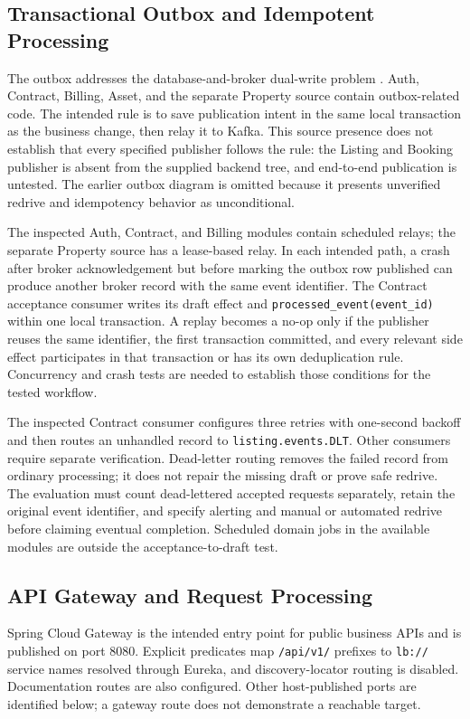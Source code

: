 \subsection{Transactional Outbox and Idempotent Processing}
The outbox addresses the database-and-broker dual-write problem \cite{kleppmann2017designing}. Auth, Contract, Billing, Asset, and the separate Property source contain outbox-related code. The intended rule is to save publication intent in the same local transaction as the business change, then relay it to Kafka. This source presence does not establish that every specified publisher follows the rule: the Listing and Booking publisher is absent from the supplied backend tree, and end-to-end publication is untested. The earlier outbox diagram is omitted because it presents unverified redrive and idempotency behavior as unconditional.

The inspected Auth, Contract, and Billing modules contain scheduled relays; the separate Property source has a lease-based relay. In each intended path, a crash after broker acknowledgement but before marking the outbox row published can produce another broker record with the same event identifier. The Contract acceptance consumer writes its draft effect and \texttt{processed\_event(event\_id)} within one local transaction. A replay becomes a no-op only if the publisher reuses the same identifier, the first transaction committed, and every relevant side effect participates in that transaction or has its own deduplication rule. Concurrency and crash tests are needed to establish those conditions for the tested workflow.

The inspected Contract consumer configures three retries with one-second backoff and then routes an unhandled record to \texttt{listing.events.DLT}. Other consumers require separate verification. Dead-letter routing removes the failed record from ordinary processing; it does not repair the missing draft or prove safe redrive. The evaluation must count dead-lettered accepted requests separately, retain the original event identifier, and specify alerting and manual or automated redrive before claiming eventual completion. Scheduled domain jobs in the available modules are outside the acceptance-to-draft test.

\subsection{API Gateway and Request Processing}
Spring Cloud Gateway is the intended entry point for public business APIs and is published on port 8080. Explicit predicates map \texttt{/api/v1/} prefixes to \texttt{lb://} service names resolved through Eureka, and discovery-locator routing is disabled. Documentation routes are also configured. Other host-published ports are identified below; a gateway route does not demonstrate a reachable target.

